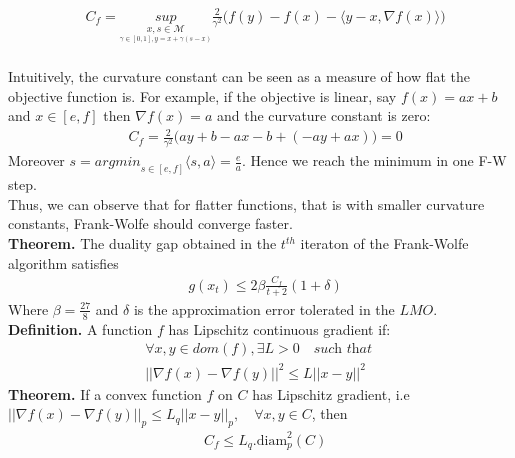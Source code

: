 \begin{equation*}
\begin{aligned}
    &C_{f}= \underset{\underset{ \gamma\in[0,1], y=x+\gamma(s-x)}{x,s\in\mathcal{M}}}{sup}\frac{2}{\gamma^{2}}\Big(f(y)- f(x)- \langle y-x, \nabla f(x)\rangle\Big)
\end{aligned}
\end{equation*}
\\
Intuitively, the curvature constant can be seen as a measure of how flat the objective function is. For example, if the objective is linear, say $f(x)= ax+ b$ and $x\in[e,f]$ then $\nabla f(x)= a$ and the curvature constant is zero:
\begin{equation*}
\begin{aligned}
    &C_{f}= \frac{2}{\gamma^{2}}\Big(ay+ b- ax- b +(-ay +ax)\Big)= 0
\end{aligned}
\end{equation*}
Moreover $s=\textit{argmin}_{s\in[e,f]}\langle s, a\rangle= \frac{e}{a}$. Hence
we reach the minimum in one F-W step.\\ Thus, we can observe that for flatter
functions, that is with smaller curvature
constants, Frank-Wolfe should converge faster. \\

\textbf{Theorem.} The duality gap obtained in the $t^{th}$  iteraton of the Frank-Wolfe algorithm satisfies
\begin{equation*}
\begin{aligned}
    &g(x_{t})\leq 2\beta\frac{C_{f}}{t+2}(1+\delta)
\end{aligned}
\end{equation*}
Where $\beta= \frac{27}{8}$ and $\delta$ is the approximation error tolerated in the $LMO$. \\

\textbf{Definition.} A function $f$ has Lipschitz continuous gradient if:
\begin{equation*}
\begin{aligned}
    &\forall x,y \in dom(f), \exists L >0 \quad\textit{such that}\quad\\
    &||\nabla f(x) -\nabla f(y)||^2 \leq L||x - y||^2
\end{aligned}
\end{equation*}
\textbf{Theorem.} If a convex function $f$ on $C$ has Lipschitz gradient, i.e $||\nabla f(x)- \nabla f(y)||_{p}\leq L_{q}||x- y||_{p},\quad\forall x,y\in C$, then
\begin{equation*}
\begin{aligned}
      &C_{f}\leq L_{q}.\text{diam}_{p}^{2}(C)
\end{aligned}
\end{equation*} \\

